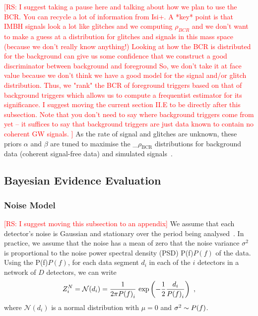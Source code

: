 \documentclass[%
 nofootinbib,
 amsmath,amssymb,
 aps,
 twocolumn
]{revtex4-2}
\newcommand{\mathcmd}[1]{{\sc \relax\ifmmode#1\else $#1$\fi}\xspace}
\newcommand{\bcr}{\mathcmd{\rho_\text{BCR}}}
\newcommand{\psd}{\mathcmd{P(f)}}
\newcommand{\rs}[1]{\textcolor{red}{[RS: #1]}}
\begin{document}
\rs{I suggest taking a pause here and talking about how we plan to use the BCR. You can recycle a lot of information from Isi+. A *key* point is that IMBH signals look a lot like glitches and we computing $\rho_{BCR}$ and we don't want to make a guess at a distribution for glitches and signals in this mass space (because we don't really know anything!) Looking at how the BCR is distributed for the background can give us some confidence that we construct a good discriminator between background and foreground
So, we don't take it at face value because we don't think we have a good model for the signal and/or glitch distribution. Thus, we "rank" the BCR of foreground triggers based on that of background triggers which allows us to compute a frequentist estimator for its significance. I suggest moving the current section II.E to be directly after this subsection. Note that you don't need to say where background triggers come from yet -- it suffices to say that background triggers are just data known to contain no coherent GW signals. }
As the rate of signal and glitches are unknown, these priors $\alpha$ and $\beta$ are tuned to maximise the \bcr distributions for background data (coherent signal-free data) and simulated signals~\cite{BCR1}.  

\subsection{Bayesian Evidence Evaluation}
\subsubsection{Noise Model}
\rs{I suggest moving this subsection to an appendix}
We assume that each detector's noise is Gaussian and stationary over the period being analysed~\cite{ligo_psd}. In practice, we assume that the noise has a mean of zero that the noise variance $\sigma^2$ is proportional to the noise power spectral density (PSD) \psd of the data. Using the \psd, for each data segment $d_i$ in each of the $i$ detectors in a network of $D$ detectors, we can write 
\begin{equation}
\label{eq:zn}
Z^N_i = \mathcal{N}(d_i) = \frac{1}{2\pi \psd_i} \ \text{exp}\left(-\frac{1}{2} \frac{d_i}{\psd_i} \right) \ ,
\end{equation}
where $\mathcal{N}(d_i)$ is a normal distribution with $\mu=0$ and $\sigma^2\sim \psd$. 
\end{document}
